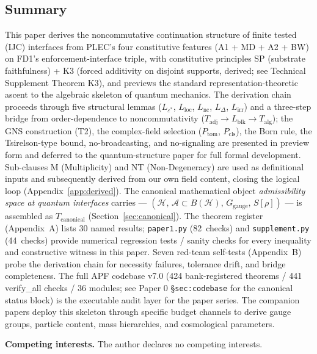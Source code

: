 \documentclass[11pt]{article}
\theoremstyle{remark}
\begin{document}
\subsection{Summary}

This paper derives the noncommutative continuation structure of finite tested (IJC) interfaces from PLEC's four constitutive features (A1 + MD + A2 + BW) on FD1's enforcement-interface triple, with constitutive principles SP (substrate faithfulness) + K3 (forced additivity on disjoint supports, derived; see Technical Supplement Theorem K3), and previews the standard representation-theoretic ascent to the algebraic skeleton of quantum mechanics.  The derivation chain proceeds through five structural lemmas ($L_{\varepsilon^*}$, $L_{\mathrm{loc}}$, $L_{\mathrm{nc}}$, $L_\Delta$, $L_{\mathrm{irr}}$) and a three-step bridge from order-dependence to noncommutativity ($T_{\mathrm{adj}} \to L_{\mathrm{blk}} \to T_{\mathrm{alg}}$); the GNS construction (T2), the complex-field selection ($P_{\mathrm{tom}}$, $P_{\mathrm{cls}}$), the Born rule, the Tsirelson-type bound, no-broadcasting, and no-signaling are presented in preview form and deferred to the quantum-structure paper for full formal development.  Sub-clauses M (Multiplicity) and NT (Non-Degeneracy) are used as definitional inputs and subsequently derived from our own field content, closing the logical loop (Appendix~\ref{app:derived}).  The canonical mathematical object \emph{admissibility space at quantum interfaces} carries --- $(\mathcal{H},\, \mathcal{A} \subset B(\mathcal{H}),\, G_{\mathrm{gauge}},\, S[\rho])$ --- is assembled as $T_{\mathrm{canonical}}$ (Section~\ref{sec:canonical}).  The theorem register (Appendix~A) lists 30 named results; \texttt{paper1.py} (82~checks) and \texttt{supplement.py} (44~checks) provide numerical regression tests / sanity checks for every inequality and constructive witness in this paper.  Seven red-team self-tests (Appendix~B) probe the derivation chain for necessity failures, tolerance drift, and bridge completeness.  The full APF codebase v7.0 (424 bank-registered theorems / 441 verify\_all checks / 36 modules; see Paper 0 \S\texttt{sec:codebase} for the canonical status block) is the executable audit layer for the paper series.  The companion papers deploy this skeleton through specific budget channels to derive gauge groups, particle content, mass hierarchies, and cosmological parameters.

\bigskip
\noindent\textbf{Competing interests.}  The author declares no competing interests.
\end{document}
